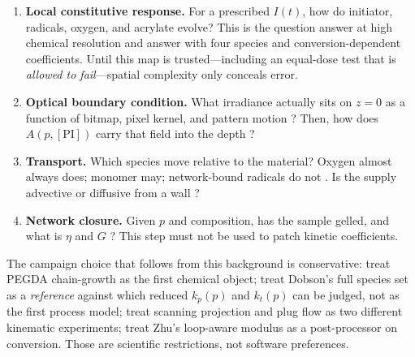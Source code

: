 \begin{enumerate}
  \item \textbf{Local constitutive response.}
    For a prescribed $I(t)$, how do initiator, radicals, oxygen, and acrylate evolve?
    This is the question \citet{Dobson2024} answer at high chemical resolution and \citet{Montgomery2022} answer with four species and conversion-dependent coefficients.
    Until this map is trusted---including an equal-dose test that is \emph{allowed to fail}---spatial complexity only conceals error.
  \item \textbf{Optical boundary condition.}
    What irradiance actually sits on $z=0$ as a function of bitmap, pixel kernel, and pattern motion \citep{Meenakshisundaram2020}?
    Then, how does $A(p,[\mathrm{PI}])$ carry that field into the depth \citep{Montgomery2022,Zhu2020}?
  \item \textbf{Transport.}
    Which species move relative to the material?
    Oxygen almost always does; monomer may; network-bound radicals do not \citep{Dobson2024,Montgomery2022}.
    Is the supply advective \citep{Slutzky2019} or diffusive from a wall \citep{Dendukuri2008}?
  \item \textbf{Network closure.}
    Given $p$ and composition, has the sample gelled, and what is $\eta$ and $G$ \citep{Zhu2020}?
    This step must not be used to patch kinetic coefficients.
\end{enumerate}

The campaign choice that follows from this background is conservative: treat PEGDA chain-growth as the first chemical object; treat Dobson's full species set as a \emph{reference} against which reduced $k_p(p)$ and $k_t(p)$ can be judged, not as the first process model; treat scanning projection and plug flow as two different kinematic experiments; treat Zhu's loop-aware modulus as a post-processor on conversion.
Those are scientific restrictions, not software preferences.

